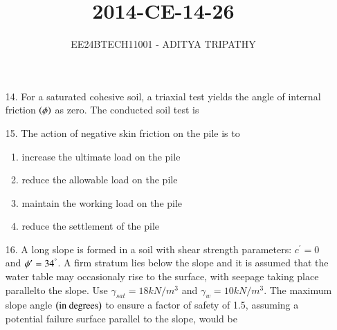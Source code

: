 \documentclass[journal,12pt,onecolumn]{IEEEtran}
\theoremstyle{remark}
\begin{document}

\vspace{3cm}

\title{2014-CE-14-26}
\author{EE24BTECH11001 -  ADITYA TRIPATHY}
\maketitle

\renewcommand{\thefigure}{\theenumi}
\renewcommand{\thetable}{\theenumi}

\begin{enumerate}
    \item[14.] 
        For a saturated cohesive soil, a triaxial test yields the angle of internal friction
        $\left(\phi\right)$ as zero. The conducted soil test is
        \hfill{}
        \begin{enumerate}
        \end{enumerate}

    \item[15.] The action of negative skin friction on the pile is to 		
        \hfill{}
        \begin{enumerate}
            \item increase the ultimate load on the pile
            \item  reduce the allowable load on the pile 
            \item  maintain the working load on the pile
            \item  reduce the settlement of the pile
        \end{enumerate}


    \item[16.] A long slope is formed in a soil with shear strength parameters: $c^{\prime} = 0$ 
        and $\phi^{\prime} = 34^{\degree}$. A firm stratum lies below the slope and it is assumed that
        the water table may occasionaly rise to the surface, with seepage taking place parallelto the slope.
        Use $\gamma_{sat}= 18 kN/m^{3}$ and $\gamma_w = 10 kN/m^3$. The maximum slope angle $\left(\textnormal{in degrees}\right)$
        to ensure a factor of safety of 1.5, assuming a potential failure surface parallel to the slope, 
        would be
        \hfill{}
        \begin{multicols}{4}


\end{multicols}
\end{enumerate}
\end{document}
